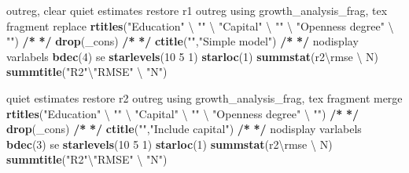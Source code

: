 \documentclass[
  12pt,
]{article}
\newenvironment{Shaded}{\begin{snugshade}}{\end{snugshade}}
\newcommand{\DecValTok}[1]{\textcolor[rgb]{0.00,0.00,0.81}{#1}}
\newcommand{\ErrorTok}[1]{\textcolor[rgb]{0.64,0.00,0.00}{\textbf{#1}}}
\newcommand{\KeywordTok}[1]{\textcolor[rgb]{0.13,0.29,0.53}{\textbf{#1}}}
\newcommand{\NormalTok}[1]{#1}
\newcommand{\OperatorTok}[1]{\textcolor[rgb]{0.81,0.36,0.00}{\textbf{#1}}}
\newcommand{\StringTok}[1]{\textcolor[rgb]{0.31,0.60,0.02}{#1}}
\begin{document}
\begin{Shaded}
\begin{Highlighting}[]
{\NormalTok{outreg, clear}
\NormalTok{    quiet estimates restore r1}
\NormalTok{        outreg using growth_analysis_frag, tex fragment replace }\KeywordTok{rtitles}\NormalTok{(}\StringTok{"Education"}\NormalTok{ \textbackslash{} }\StringTok{""}\NormalTok{ \textbackslash{} }\StringTok{"Capital"}\NormalTok{ \textbackslash{} }\StringTok{""}\NormalTok{ \textbackslash{} }\StringTok{"Openness degree"}\NormalTok{ \textbackslash{} }\StringTok{""}\NormalTok{)  }\OperatorTok{/}\ErrorTok{*}
\StringTok{                }\ErrorTok{*/}\StringTok{ }\KeywordTok{drop}\NormalTok{(_cons) }\OperatorTok{/}\ErrorTok{*}
\StringTok{                }\ErrorTok{*/}\StringTok{ }\KeywordTok{ctitle}\NormalTok{(}\StringTok{""}\NormalTok{,}\StringTok{"Simple model"}\NormalTok{) }\OperatorTok{/}\ErrorTok{*}
\StringTok{                }\ErrorTok{*/}\StringTok{ }\NormalTok{nodisplay varlabels }\KeywordTok{bdec}\NormalTok{(}\DecValTok{4}\NormalTok{) se }\KeywordTok{starlevels}\NormalTok{(}\DecValTok{10} \DecValTok{5} \DecValTok{1}\NormalTok{) }\KeywordTok{starloc}\NormalTok{(}\DecValTok{1}\NormalTok{) }\KeywordTok{summstat}\NormalTok{(r2\textbackslash{}rmse \textbackslash{} N) }\KeywordTok{summtitle}\NormalTok{(}\StringTok{"R2"}\NormalTok{\textbackslash{}}\StringTok{"RMSE"}\NormalTok{ \textbackslash{} }\StringTok{"N"}\NormalTok{)}

\NormalTok{    quiet estimates restore r2}
\NormalTok{        outreg using growth_analysis_frag, tex fragment merge }\KeywordTok{rtitles}\NormalTok{(}\StringTok{"Education"}\NormalTok{ \textbackslash{} }\StringTok{""}\NormalTok{ \textbackslash{} }\StringTok{"Capital"}\NormalTok{ \textbackslash{} }\StringTok{""}\NormalTok{ \textbackslash{} }\StringTok{"Openness degree"}\NormalTok{ \textbackslash{} }\StringTok{""}\NormalTok{)  }\OperatorTok{/}\ErrorTok{*}
\StringTok{                }\ErrorTok{*/}\StringTok{ }\KeywordTok{drop}\NormalTok{(_cons) }\OperatorTok{/}\ErrorTok{*}
\StringTok{                }\ErrorTok{*/}\StringTok{ }\KeywordTok{ctitle}\NormalTok{(}\StringTok{""}\NormalTok{,}\StringTok{"Include capital"}\NormalTok{) }\OperatorTok{/}\ErrorTok{*}
\StringTok{                }\ErrorTok{*/}\StringTok{ }\NormalTok{nodisplay varlabels }\KeywordTok{bdec}\NormalTok{(}\DecValTok{3}\NormalTok{) se }\KeywordTok{starlevels}\NormalTok{(}\DecValTok{10} \DecValTok{5} \DecValTok{1}\NormalTok{) }\KeywordTok{starloc}\NormalTok{(}\DecValTok{1}\NormalTok{) }\KeywordTok{summstat}\NormalTok{(r2\textbackslash{}rmse \textbackslash{} N) }\KeywordTok{summtitle}\NormalTok{(}\StringTok{"R2"}\NormalTok{\textbackslash{}}\StringTok{"RMSE"}\NormalTok{ \textbackslash{} }\StringTok{"N"}\NormalTok{)}

}
\end{Highlighting}
\end{Shaded}
\end{document}

